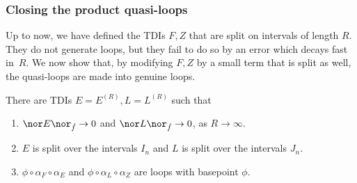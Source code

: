 \subsubsection{Closing the product quasi-loops}

Up to now, we have defined the TDIs $F,Z$ that are split on intervals of length $R$. They do not generate loops, but they fail to do so by an error which decays fast in~$R$. We now show that, by modifying $F,Z$ by a small term that is split as well, the quasi-loops are made into genuine loops.
\begin{lemma}\label{lem: closure quasi loops}
	There are TDIs $E=E^{(R)},L=L^{(R)}$ such that 
	\begin{enumerate}
		\item  $\nor E \nor_{\hat{f}}\to 0 $ and $\nor L \nor_{\hat{f}}\to 0 $, as $R\to\infty$.
		\item  $E$ is split over the intervals $I_n$ and $L$ is split over the intervals $J_n$.
		\item  $\phi \circ  \alpha_{F} \circ \alpha_{E}$  and $\phi  \circ \alpha_{L} \circ \alpha_{Z}$ are loops with basepoint $\phi$.
	\end{enumerate}
\end{lemma}
